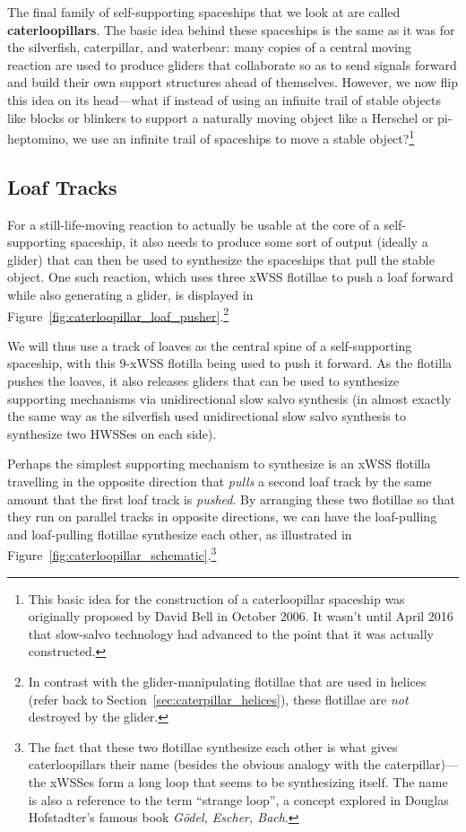 The final family of self-supporting spaceships that we look at are called \textbf{caterloopillars}. The basic idea behind these spaceships is the same as it was for the silverfish, caterpillar, and waterbear: many copies of a central moving reaction are used to produce gliders that collaborate so as to send signals forward and build their own support structures ahead of themselves. However, we now flip this idea on its head---what if instead of using an infinite trail of stable objects like blocks or blinkers to support a naturally moving object like a Herschel or pi-heptomino, we use an infinite trail of spaceships to move a stable object?\footnote{This basic idea for the construction of a caterloopillar spaceship was originally proposed by David Bell in October 2006. It wasn't until April 2016 that slow-salvo technology had advanced to the point that it was actually constructed.}


\subsection{Loaf Tracks}\label{sec:caterloopillar_loaf_track}

For a still-life-moving reaction to actually be usable at the core of a self-supporting spaceship, it also needs to produce some sort of output (ideally a glider) that can then be used to synthesize the spaceships that pull the stable object. One such reaction, which uses three xWSS flotillae to push a loaf forward while also generating a glider, is displayed in Figure~\ref{fig:caterloopillar_loaf_pusher}.\footnote{In contrast with the glider-manipulating flotillae that are used in helices (refer back to Section~\ref{sec:caterpillar_helices}), these flotillae are \emph{not} destroyed by the glider.}

We will thus use a track of loaves as the central spine of a self-supporting spaceship, with this 9-xWSS flotilla being used to push it forward. As the flotilla pushes the loaves, it also releases gliders that can be used to synthesize supporting mechanisms via unidirectional slow salvo synthesis (in almost exactly the same way as the silverfish used unidirectional slow salvo synthesis to synthesize two HWSSes on each side).

Perhaps the simplest supporting mechanism to synthesize is an xWSS flotilla travelling in the opposite direction that \emph{pulls} a second loaf track by the same amount that the first loaf track is \emph{pushed}. By arranging these two flotillae so that they run on parallel tracks in opposite directions, we can have the loaf-pulling and loaf-pulling flotillae synthesize each other, as illustrated in Figure~\ref{fig:caterloopillar_schematic}.\footnote{The fact that these two flotillae synthesize each other is what gives caterloopillars their name (besides the obvious analogy with the caterpillar)---the xWSSes form a long loop that seems to be synthesizing itself. The name is also a reference to the term ``strange loop'', a concept explored in Douglas Hofstadter's famous book \emph{G\"{o}del, Escher, Bach}.}


